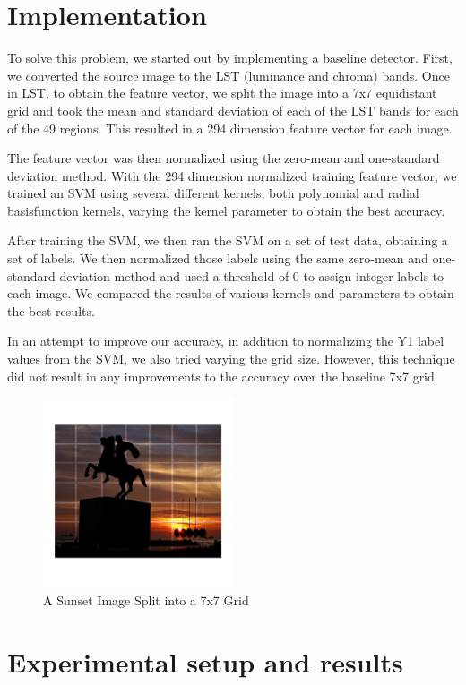 \documentclass{article}
\begin{document}
\section{Implementation}
To solve this problem, we started out by implementing a baseline detector. First, we converted the source image to the LST (luminance and chroma) bands. Once in LST, to obtain the feature vector, we split the image into a 7x7 equidistant grid and took the mean and standard deviation of each of the LST bands for each of the 49 regions. This resulted in a 294 dimension feature vector for each image. 

The feature vector was then normalized using the zero-mean and one-standard deviation method. With the 294 dimension normalized training feature vector, we trained an SVM using several different kernels, both polynomial and radial basisfunction kernels, varying the kernel parameter to obtain the best accuracy. 

After training the SVM, we then ran the SVM on a set of test data, obtaining a set of labels. We then normalized those labels using the same zero-mean and one-standard deviation method and used a threshold of 0 to assign integer labels to each image. We compared the results of various kernels and parameters to obtain the best results. 

In an attempt to improve our accuracy, in addition to normalizing the Y1 label values from the SVM, we also tried varying the grid size. However, this technique did not result in any improvements to the accuracy over the baseline 7x7 grid. 

\begin{figure}
\centering
\includegraphics[width=0.5\textwidth]{process-image.png}
\caption{A Sunset Image Split into a 7x7 Grid}
\label{fig:process-image}
\end{figure}

\section{Experimental setup and results}
\label{sec:results}
\end{document}
